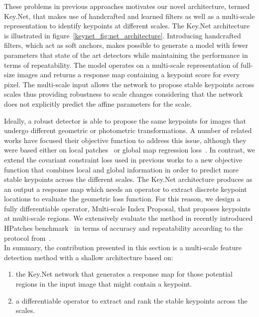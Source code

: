 These problems in previous approaches motivates our novel architecture, termed Key.Net, that makes use of handcrafted and learned filters as well as a multi-scale representation to identify keypoints at different scales. 
The Key.Net architecture is illustrated in figure~\ref{keynet_fig:net_architecture}. Introducing handcrafted filters, which act as soft anchors, makes possible to generate a model with fewer parameters that state of the art detectors while maintaining the performance in terms of repeatability. The model operates on a multi-scale representation of full-size images and returns a response map containing a keypoint score for every pixel. The multi-scale input allows the network to propose stable keypoints across scales thus providing robustness to scale changes considering that the network does not explicitly predict the affine parameters for the scale. 

Ideally, a robust detector is able to propose the same keypoints for images that undergo different geometric or photometric transformations. A number of related works have focused their objective function to address this issue, although they were based either on local patches~\cite{Karel_Vedaldi_ECCV_16, Zhang_Felix_CVPR_17} or global map regression loss~\cite{detone2017superpoint, TILDE, OnoSerra18}. In contrast, we extend the covariant constraint loss used in previous works to a new objective function that combines local and global information in order to predict more stable keypoints across the different scales. The Key.Net architecture produces as an output a response map which needs an operator to extract discrete keypoint locations to evaluate the geometric loss function. For this reason, we design a fully differentiable operator, Multi-scale Index Proposal, that proposes keypoints at multi-scale regions. We extensively evaluate the method in recently introduced HPatches benchmark~\cite{HPatches} in terms of accuracy and repeatability according to the protocol from~\cite{mikolajczykpami2005}.\\

\noindent In summary, the contribution presented in this section is a multi-scale feature detection method with a shallow architecture based on:

\begin{enumerate}
    \item the Key.Net network that generates a response map for those potential regions in the input image that might contain a keypoint.
    \item a differentiable operator to extract and rank the stable keypoints across the scales.
\end{enumerate}

